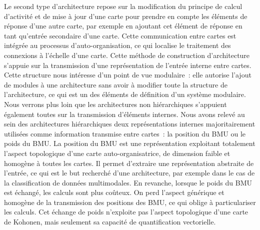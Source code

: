 \documentclass[../main]{subfiles}
\begin{document}
Le second type d'architecture repose sur la modification du principe de calcul d'activité et de mise à jour d'une carte pour prendre en compte les éléments de réponse d'une autre carte, par exemple en ajoutant cet élément de réponse en tant qu'entrée secondaire d'une carte.
Cette communication entre cartes est intégrée au processus d'auto-organisation, ce qui localise le traitement des connexions à l'échelle d'une carte. 
Cette méthode de construction d'architecture s'appuie sur la transmission d'une représentation de l'entrée interne entre cartes.
Cette structure nous intéresse d'un point de vue modulaire~: elle autorise l'ajout de modules à une architecture sans avoir à modifier toute la structure de l'architecture, ce qui est un des éléments de définition d'un système modulaire.
Nous verrons plus loin que les architectures non hiérarchiques s'appuient également toutes sur la transmission d'éléments internes.
Nous avons relevé au sein des architectures hiérarchiques deux représentations internes majoritairement utilisées comme information transmise entre cartes~: la position du BMU ou le poids du BMU. La position du BMU est une représentation exploitant totalement l'aspect topologique d'une carte auto-organisatrice, de dimension faible et homogène à toutes les cartes. Il permet d'extraire une représentation abstraite de l'entrée, ce qui est le but recherché d'une architecture, par exemple dans le cas de la classification de données multimodales.
En revanche, lorsque le poids du BMU est échangé, les calculs sont plus coûteux. On perd l'aspect générique et homogène de la transmission des positions des BMU, ce qui oblige à particulariser les calculs. Cet échange de poids n'exploite pas l'aspect topologique d'une carte de Kohonen, mais seulement sa capacité de quantification vectorielle.
\end{document}
